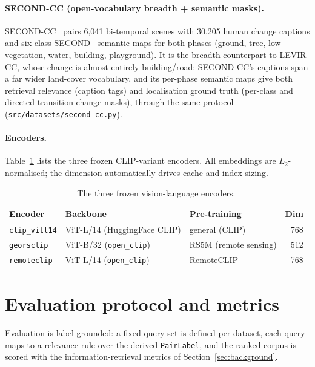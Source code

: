\documentclass{article}
\begin{document}
\paragraph{SECOND-CC (open-vocabulary breadth + semantic masks).}
SECOND-CC~\cite{secondcc} pairs 6{,}041 bi-temporal scenes with 30{,}205 human
change captions and six-class SECOND~\cite{second} semantic maps for both
phases (ground, tree, low-vegetation, water, building, playground). It is the
breadth counterpart to LEVIR-CC, whose change is almost entirely building/road:
SECOND-CC's captions span a far wider land-cover vocabulary, and its per-phase
semantic maps give both retrieval relevance (caption tags) and localisation
ground truth (per-class and directed-transition change masks), through the same
protocol (\texttt{src/datasets/second\_cc.py}).

\paragraph{Encoders.}
Table~\ref{tab:encoders} lists the three frozen CLIP-variant encoders. All
embeddings are $L_2$-normalised; the dimension automatically drives cache and
index sizing.

\begin{table}[H]
    \centering
    \caption{The three frozen vision-language encoders.}
    \label{tab:encoders}
    \begin{tabular}{lllr}
        \toprule
        \textbf{Encoder} & \textbf{Backbone} & \textbf{Pre-training} & \textbf{Dim} \\
        \midrule
        \texttt{clip\_vitl14} & ViT-L/14 (HuggingFace CLIP)        & general (CLIP)       & 768 \\
        \texttt{georsclip}    & ViT-B/32 (\texttt{open\_clip})     & RS5M (remote sensing) & 512 \\
        \texttt{remoteclip}   & ViT-L/14 (\texttt{open\_clip})     & RemoteCLIP            & 768 \\
        \bottomrule
    \end{tabular}
\end{table}


\section{Evaluation protocol and metrics}
\label{sec:eval}

Evaluation is label-grounded: a fixed query set is defined per dataset, each
query maps to a relevance rule over the derived \texttt{PairLabel}, and the
ranked corpus is scored with the information-retrieval metrics of
Section~\ref{sec:background}.
\end{document}
